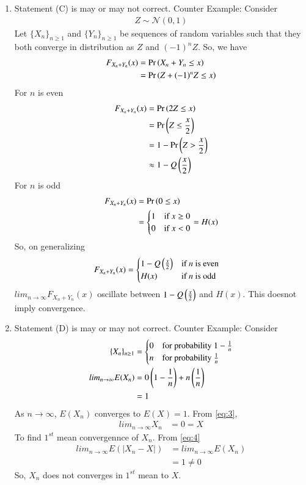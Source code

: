 \documentclass[journal,12pt,twocolumn]{IEEEtran}
\theoremstyle{remark}
\begin{document}
\begin{enumerate}[label=(\Alph*)]
\item Statement (C) is may or may not correct.
Counter Example: Consider
\begin{align}
Z \sim \mathcal{N}(0,1)
\end{align}
Let $\{X_n\}_{n \geq 1}$ and $\{Y_n\}_{n \geq 1}$ be sequences of random variables such that they both converge in distribution as $Z$ and $(-1)^nZ$. So, we have
\begin{align}
F_{X_n+Y_n}(x) &= \Pr\left(X_n+Y_n \leq x\right)\\
&=\Pr\left(Z+(-1)^nZ \leq x\right)
\end{align}
For $n$ is even
\begin{align}
F_{X_n+Y_n}(x) &= \Pr\left(2Z \leq x\right)\\
&=\Pr\left(Z \leq \frac{x}{2}\right)\\
&=1-\Pr\left(Z>\frac{x}{2}\right)\\
& \approx 1-Q\left(\frac{x}{2}\right)
\end{align}
For $n$ is odd
\begin{align}
F_{X_n+Y_n}(x) &= \Pr\left(0 \leq x\right)\\
&=\begin{cases}
            1 & \text{if } x \geq 0\\
            0 & \text{if } x<0
        \end{cases}
        =H(x)
\end{align}
So, on generalizing
\begin{align}
F_{X_n+Y_n}(x)
&=\begin{cases}
            1-Q\left(\frac{x}{2}\right) & \text{if } n \text{ is even}\\
            H(x) & \text{if } n \text{ is odd}
        \end{cases}
\end{align}
$lim_{n \to \infty} F_{X_n+Y_n}(x)$ oscillate between $1-Q\left(\frac{x}{2}\right)$ and $H(x)$. This doesnot imply convergence.
\item Statement (D) is may or may not correct.
Counter Example:
Consider 
\begin{align}
\{X_n\}_{n \geq 1}&= \begin{cases}
            0 & \text{for probability } 1-\frac{1}{n}\\
            n & \text{for probability } \frac{1}{n}
        \end{cases}
        \label{eq:3}\\
lim_{n \to \infty} E(X_n)&=0\left(1-\frac{1}{n}\right)+n\left(\frac{1}{n}\right)\\
&=1\label{eq:4}
\end{align}
As $n \to \infty$, $E(X_n)$ converges to $E(X)=1$. From \eqref{eq:3},
\begin{align}
lim_{n \to \infty} X_n&=0=X
\end{align}
To find $1^{st}$ mean convergennce of $X_n$. From \eqref{eq:4}
\begin{align}
lim_{n \to \infty} E(|X_n-X|)&=lim_{n \to \infty} E(X_n)\\
&=1 \ne 0
\end{align}
So, $X_n$ does not converges in $1^{st}$ mean to $X$.
\end{enumerate}
\end{document}
